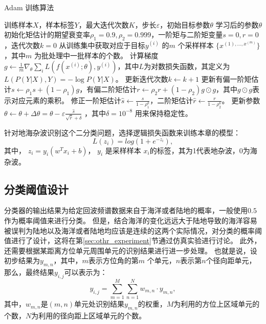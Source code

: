 \begin{algorithm}[hbt]
	\caption{Adam 训练算法}
	\label{tab:Adam}
	\begin{algorithmic}[1] %
		\Require 训练样本$X$，样本标签$Y$，最大迭代次数$K$，步长$\varepsilon$，初始目标参数$\theta$
		\Ensure 学习后的参数$\theta$
		\State 初始化矩估计的期望衰变率$\rho_1=0.9,\rho_2=0.999$，一阶矩与二阶矩变量$s=0,r=0$，迭代次数$k=0$
			\State 从训练集中获取对应于目标$y^{(i)}$ 的$m$ 个采样样本 $\{x^{(1),\dots,x^{(m)}}\}$ ，其中$m$ 为批处理中一批样本的个数。
			\label{line:start}
			\State 计算梯度$g \leftarrow \frac{1}{m} \nabla_{\theta} \sum_i L(f(x^{(i)};\theta), y^{(i)}) $，其中$L$为对数损失函数，其定义为$L(P(Y|X),Y) = - \log P(Y|X) $。
			\State 更新迭代次数$k \leftarrow k+1 $
			\State 更新有偏一阶矩估计$s \leftarrow \rho_1 s + (1 - \rho_1) g $，有偏二阶矩估计$r \leftarrow \rho_2 r + (1-\rho_2) g \odot g $，其中$ g \odot g $表示对应元素的乘积。
			\State 修正一阶矩估计$\hat{s} \leftarrow \frac{s}{1-\rho^k_1} $，二阶矩估计$\hat{r} \leftarrow \frac{r}{1-\rho^k_2} $。
			\State 更新参数 $\theta \leftarrow \theta + \Delta \theta = \theta - \varepsilon \frac{\hat{s}}{\sqrt{\hat{r}} + \delta} $
			，其中$\delta = 10^{-8} $
			用来保持稳定性。
		\EndWhile
	\end{algorithmic}
\end{algorithm}

针对地海杂波识别这个二分类问题，选择逻辑损失函数来训练本章的模型：
\begin{equation}
	L(z_i) = log(1+e^{-z_i}),
\end{equation}
其中， $z_i=y_i(w^T x_i + b)$， $y_i$ 是采样样本 $x_i$的标签，其为1代表地杂波，0为海杂波。

\subsection{分类阈值设计}
分类器的输出结果为给定回波频谱数据来自于海洋或者陆地的概率，一般使用$ 0.5 $作为概率阈值来进行分类。
但是，结合海洋的变化远远大于陆地导致的海洋容易被误判为陆地以及海洋或者陆地均应该是连续的这两个实际情况，对分类的概率阈值进行了设计，这将在第\ref{sec:othr_experiment}节通过仿真实验进行讨论。
此外，还需要根据某距离方位单元周围单元的识别结果进行进一步处理。
也就是说，设初步结果为$y_{m,n}$，其中，$m$表示方位角的第$ m $ 个单元，$ n $表示第$ n $个径向距单元，那么，最终结果$y_{i, j}$可以表示为：
\begin{equation}
y_{i, j} = \sum_{m=1}^{M}\sum_{n=1}^{N}w_{m,n}\cdot y_{m,n},
\end{equation}
其中，$ w_{m,n} $是$(m,n)$单元处识别结果$y_{m,n}$的权重，$M$为利用的方位上区域单元的个数，$N$为利用的径向距上区域单元的个数。
